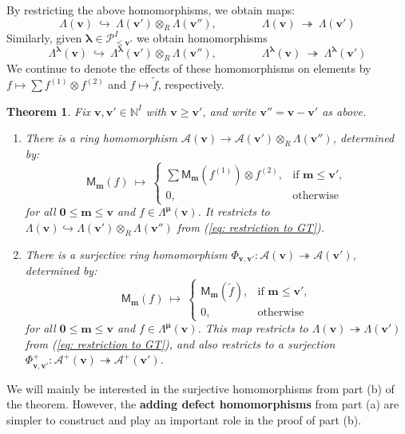 \documentclass[11pt,reqno]{amsart}
\renewcommand{\mathbf}{\mathbold}
\numberwithin{equation}{section}
\newtheorem{Theorem}[equation]{Theorem}
\theoremstyle{definition}
\newcommand{\cA}{\mathcal{A}}
\newcommand{\cP}{\mathcal{P}}
\newcommand{\bm}{\mathbf{m}}
\newcommand{\bv}{\mathbf{v}}
\newcommand{\NN}{\mathbb{N}}
\renewcommand{\bv}{\mathbf{v}} %
\newcommand{\M}{\mathsf{M}}
\newcommand{\vertexset}{I}
\newcommand{\GT}{\Lambda}
\newcommand{\base}{R}
\newcommand{\Partitions}{\cP}
\newcommand{\bla}{{\boldsymbol{\lambda}}}
\newcommand{\bmu}{{\boldsymbol{\mu}}}
\newcommand{\qzast}{\cA}
\newcommand{\qzastplus}{\cA^{+}}
\begin{document}
By restricting the above homomorphisms, we obtain maps:
\begin{equation}
\label{eq: restriction to GT}
\GT(\bv) \ \hookrightarrow \ \GT(\bv') \otimes_{\base} \GT(\bv''), \qquad \qquad \GT(\bv) \ \twoheadrightarrow \ \GT(\bv')
\end{equation}
Similarly, given $\bla \in \Partitions_{\leq \bv'}^\vertexset$ we obtain  homomorphisms
\begin{equation}
\label{eq: restriction to GT 2}
\GT^{\bla}(\bv) \ \hookrightarrow \ \GT^{\bla}(\bv') \otimes_{\base} \GT(\bv''), \qquad \qquad \GT^{\bla}(\bv) \ \twoheadrightarrow \ \GT^{\bla}(\bv')
\end{equation}
We continue to denote the effects of these homomorphisms on elements by $f \mapsto \sum f^{(1)} \otimes f^{(2)}$ and $f\mapsto \widetilde{f}$, respectively.

\begin{Theorem}
\label{thm: defect and embeddings}
Fix $\bv, \bv' \in \NN^\vertexset$ with $\bv \geq \bv'$, and write $\bv'' = \bv - \bv'$ as above.
\begin{enumerate}[label=(\alph*),topsep=3pt,itemsep = 5pt]
\item There is a ring homomorphism $\qzast(\bv) \rightarrow \qzast(\bv') \otimes_{\base} \GT(\bv'')$,  determined by:
$$
\M_\bm(f) \ \mapsto \ \left\{ \begin{array}{cl} \sum \M_{\bm}(f^{(1)}) \otimes f^{(2)}, & \text{if } \bm \leq \bv', \\ 0, & \text{otherwise} \end{array} \right.
$$
for all $\mathbf{0} \leq \bm \leq \bv$ and $f \in \GT^{\bmu}(\bv)$.  It restricts to $\GT(\bv) \hookrightarrow \GT(\bv') \otimes_{\base} \GT(\bv'')$ from (\ref{eq: restriction to GT}).

\item There is a {surjective} ring homomorphism $\Phi_{\bv, \bv'}: \qzast(\bv) \twoheadrightarrow \qzast(\bv')$,  determined by:
$$
\M_\bm(f) \ \mapsto \ \left\{ \begin{array}{cl} \M_\bm(\widetilde{f}), &\text{if } \bm \leq \bv', \\ 0, & \text{otherwise} \end{array} \right.
$$
for all $\mathbf{0} \leq \bm \leq \bv$ and $f \in \GT^{\bmu}(\bv)$. This map restricts to $\GT(\bv) \twoheadrightarrow \GT(\bv')$ from (\ref{eq: restriction to GT}), and also restricts to a surjection $\Phi_{\bv, \bv'}^+:  \qzastplus(\bv) \twoheadrightarrow \qzastplus(\bv')$.

\end{enumerate}
\end{Theorem}
We will mainly be interested in the surjective homomorphisms from part (b) of the theorem.  However, the \textbf{adding defect homomorphisms} from part (a)  are simpler to construct and play an important role in the proof of part (b).
\end{document}
